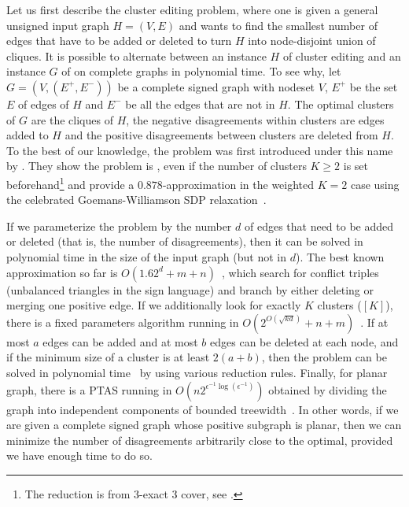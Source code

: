 Let us first describe the cluster editing problem, where one is given a general unsigned input graph
$H=(V,E)$ and wants to
find the smallest number of edges that have to be added or deleted to turn $H$ into node-disjoint
union of cliques. It is possible to alternate between an instance $H$ of cluster editing and an
instance $G$ of \pcc{} on complete graphs in polynomial time. To see why, let $G=(V,(E^+,E^-))$
be a complete signed graph with nodeset $V$, $E^+$ be the set $E$ of edges of $H$ and $E^-$ be all
the edges that are not in $H$. The optimal clusters of $G$ are the cliques of $H$, the negative
disagreements within clusters are edges added to $H$ and the positive disagreements between clusters
are deleted from $H$. To the best of our knowledge, the problem was first introduced under this
name by \textcite{Shamir02}. They show the problem is
\NPc{}, even if the number of clusters $K\geq2$ is set beforehand\footnote{The reduction is from
3-exact 3 cover, see \autocite[Theorems 1, 2 and Corollary 1]{Shamir02}.} and provide a
$0.878$-approximation in the weighted $K=2$ case using the celebrated Goemans-Williamson SDP
relaxation~\autocite{MaxCutSDP95}.

If we parameterize the problem by the number $d$ of edges that need to be added or deleted (that is,
the number of disagreements), then it can be solved in polynomial time in the size of the input
graph (but not in $d$). The best known approximation so far is
$O(1.62^d+m+n)$~\autocite{GoldenCE12}, which search for conflict triples (\ie unbalanced triangles
in the sign language) and branch by either deleting or merging one positive edge. If we additionally
look for exactly $K$ clusters (\ie \mind$[K]$), there is a fixed parameters algorithm running in
$O(2^{O(\sqrt{kd})}+n+m)$~\autocite{Fomin2014}. If at most $a$ edges can be added and at most $b$
edges can be deleted at each node, and if the minimum size of a cluster is at least $2(a+b)$, then
the problem can be solved in polynomial time~\autocite{Abu-Khzam2015} by using various reduction
rules. Finally, for planar graph, there is a PTAS%
running in $O(n2^{\epsilon^{-1}\log(\epsilon^{-1})})$ obtained by dividing the graph
into independent components of bounded treewidth~\autocite{PlanarCEPTAS17}. In other words, if we
are given a complete signed graph whose positive subgraph is planar, then we can minimize the number
of disagreements arbitrarily close to the optimal, provided we have enough time to do so.

